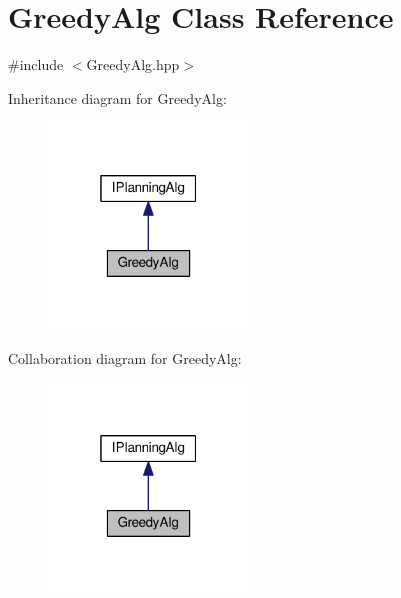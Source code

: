 \hypertarget{classGreedyAlg}{}\section{Greedy\+Alg Class Reference}
\label{classGreedyAlg}


{\ttfamily \#include $<$Greedy\+Alg.\+hpp$>$}



Inheritance diagram for Greedy\+Alg\+:
\nopagebreak
\begin{figure}[H]
\begin{center}
\leavevmode
\includegraphics[width=151pt]{classGreedyAlg__inherit__graph}
\end{center}
\end{figure}


Collaboration diagram for Greedy\+Alg\+:
\nopagebreak
\begin{figure}[H]
\begin{center}
\leavevmode
\includegraphics[width=151pt]{classGreedyAlg__coll__graph}
\end{center}
\end{figure}
